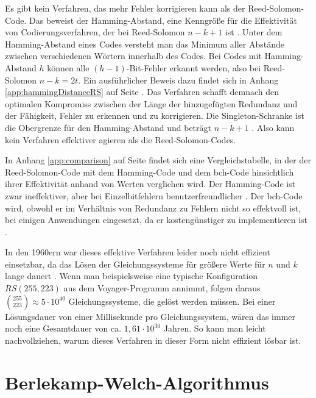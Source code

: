 Es gibt kein Verfahren, das mehr Fehler korrigieren kann als der Reed-Solomon-Code.
Das beweist der Hamming-Abstand, eine Kenngröße für die Effektivität von Codierungsverfahren, der bei Reed-Solomon $n-k+1$ ist \cite{reedPolynomialCodesCertain1960}.
Unter dem Hamming-Abstand eines Codes versteht man das Minimum aller Abstände zwischen verschiedenen Wörtern innerhalb des Codes.
Bei Codes mit Hamming-Abstand $h$ können alle $(h-1)$-Bit-Fehler erkannt werden, also bei Reed-Solomon $n-k=2t$.
Ein ausführlicher Beweis dazu findet sich in Anhang \ref{app:hammingDistanceRS} auf Seite \pageref{app:hammingDistanceRS}.
Das Verfahren schafft demnach den optimalen Kompromiss zwischen der Länge der hinzugefügten Redundanz und der Fähigkeit, Fehler zu erkennen und zu korrigieren.
Die Singleton-Schranke ist die Obergrenze für den Hamming-Abstand und beträgt $n-k+1$ \cite[Kapitel 3.3]{friedrichsKanalcodierung1996}.
Also kann kein Verfahren effektiver agieren als die Reed-Solomon-Codes.

In Anhang \ref{app:comparison} auf Seite \pageref{app:comparison} findet sich eine Vergleichstabelle, in der der Reed-Solomon-Code mit dem Hamming-Code und dem \acrshort{bch}-Code hinsichtlich ihrer Effektivität anhand von Werten verglichen wird.
Der Hamming-Code ist zwar ineffektiver, aber bei Einzelbitfehlern benutzerfreundlicher \cite{williamsHammingCodeFehlererkennungUnd2024}.
Der \acrshort{bch}-Code wird, obwohl er im Verhältnis von Redundanz zu Fehlern nicht so effektvoll ist, bei einigen Anwendungen eingesetzt, da er kostengünstiger zu implementieren ist \cite[Kapitel 3]{schulz-hankeBCHCodesCombined2023}. 

In den 1960ern war dieses effektive Verfahren leider noch nicht effizient einsetzbar, da das Lösen der Gleichungssysteme für größere Werte für $n$ und $k$ lange dauert \cite{verbeureReedSolomonErrorCorrecting2022}. 
Wenn man beispielsweise eine typische Konfiguration $RS(255,223)$ aus dem Voyager-Programm annimmt, folgen daraus $\binom{255}{223}\approx5\cdot 10^{40}$ Gleichungssysteme, die gelöst werden müssen.
Bei einer Lösungsdauer von einer Millisekunde pro Gleichungssystem, wären das immer noch eine Gesamtdauer von ca. $1,61\cdot10^{30}$ Jahren. 
So kann man leicht nachvollziehen, warum dieses Verfahren in dieser Form nicht effizient lösbar ist.

\section{Berlekamp-Welch-Algorithmus}\label{sec:bwAlgo}

